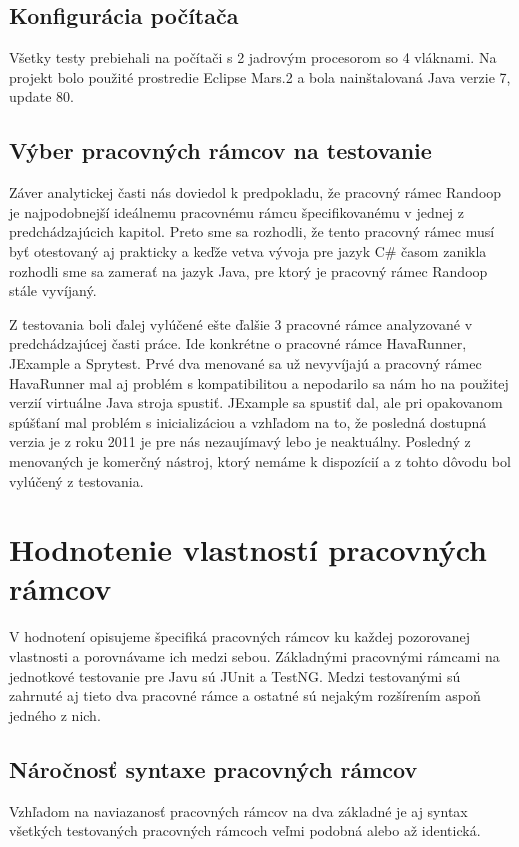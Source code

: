 \documentclass[11pt,twoside,slovak,a4paper]{article}
\begin{document}
	\subsection{Konfigurácia počítača}
	Všetky testy prebiehali na počítači s 2 jadrovým procesorom so 4 vláknami. Na projekt bolo použité prostredie Eclipse Mars.2 a bola nainštalovaná Java verzie 7, update 80.
	
	\subsection{Výber pracovných rámcov na testovanie}
	Záver analytickej časti nás doviedol k predpokladu, že pracovný rámec Randoop je najpodobnejší ideálnemu pracovnému rámcu špecifikovanému v jednej z predchádzajúcich kapitol. Preto sme sa rozhodli, že tento pracovný rámec musí byť otestovaný aj prakticky a keďže vetva vývoja pre jazyk C\# časom zanikla rozhodli sme sa zamerať na jazyk Java, pre ktorý je pracovný rámec Randoop stále vyvíjaný. 
	
	Z testovania boli ďalej vylúčené ešte ďalšie 3 pracovné rámce analyzované v predchádzajúcej časti práce. Ide konkrétne o pracovné rámce HavaRunner, JExample a Sprytest. Prvé dva menované sa už nevyvíjajú a pracovný rámec HavaRunner mal aj problém s kompatibilitou a nepodarilo sa nám ho na použitej verzií virtuálne Java stroja spustiť. JExample sa spustiť dal, ale pri opakovanom spúšťaní mal problém s inicializáciou a vzhľadom na to, že posledná dostupná verzia je z roku 2011 je pre nás nezaujímavý lebo je neaktuálny. Posledný z menovaných je komerčný nástroj, ktorý nemáme k dispozícií a z tohto dôvodu bol vylúčený z testovania.
	
	\newpage
	\thispagestyle{plain}
	\section{Hodnotenie vlastností pracovných rámcov}
	
	V hodnotení opisujeme špecifiká pracovných rámcov ku každej pozorovanej vlastnosti a porovnávame ich medzi sebou. Základnými pracovnými rámcami na jednotkové testovanie pre Javu sú JUnit a TestNG. Medzi testovanými sú zahrnuté aj tieto dva pracovné rámce a ostatné sú nejakým rozšírením aspoň jedného z nich.
	
	
	\subsection{Náročnosť syntaxe pracovných rámcov}
	Vzhľadom na naviazanosť pracovných rámcov na dva základné je aj syntax všetkých testovaných pracovných rámcoch veľmi podobná alebo až identická.
	
\end{document}
